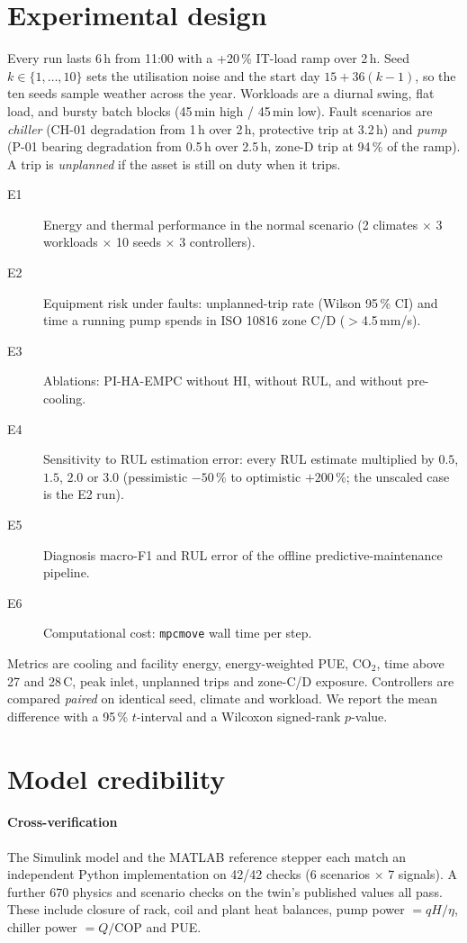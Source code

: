 \documentclass[preprint,12pt,authoryear]{elsarticle}
\begin{document}
\section{Experimental design}\label{sec:design}
Every run lasts 6\,h from 11:00 with a +20\,\% IT-load ramp over 2\,h. Seed $k\in\{1,\dots,10\}$ sets the utilisation noise and the start day $15+36(k-1)$, so the ten seeds sample weather across the year. Workloads are a diurnal swing, flat load, and bursty batch blocks (45\,min high / 45\,min low). Fault scenarios are \emph{chiller} (CH-01 degradation from 1\,h over 2\,h, protective trip at 3.2\,h) and \emph{pump} (P-01 bearing degradation from 0.5\,h over 2.5\,h, zone-D trip at 94\,\% of the ramp). A trip is \emph{unplanned} if the asset is still on duty when it trips.
\begin{description}
\item[E1] Energy and thermal performance in the normal scenario (2 climates $\times$ 3 workloads $\times$ 10 seeds $\times$ 3 controllers).
\item[E2] Equipment risk under faults: unplanned-trip rate (Wilson 95\,\% CI) and time a running pump spends in ISO 10816 zone C/D ($>$4.5\,mm/s).
\item[E3] Ablations: PI-HA-EMPC without HI, without RUL, and without pre-cooling.
\item[E4] Sensitivity to RUL estimation error: every RUL estimate multiplied by $0.5$, $1.5$, $2.0$ or $3.0$ (pessimistic $-50$\,\% to optimistic $+200$\,\%; the unscaled case is the E2 run).
\item[E5] Diagnosis macro-F1 and RUL error of the offline predictive-maintenance pipeline.
\item[E6] Computational cost: \texttt{mpcmove} wall time per step.
\end{description}
Metrics are cooling and facility energy, energy-weighted PUE, CO$_2$, time above 27 and 28\,\textdegree C, peak inlet, unplanned trips and zone-C/D exposure. Controllers are compared \emph{paired} on identical seed, climate and workload. We report the mean difference with a 95\,\% $t$-interval and a Wilcoxon signed-rank $p$-value.

\section{Model credibility}\label{sec:cred}
\paragraph{Cross-verification} The Simulink model and the MATLAB reference stepper each match an independent Python implementation on 42/42 checks (6 scenarios $\times$ 7 signals). A further 670 physics and scenario checks on the twin's published values all pass. These include closure of rack, coil and plant heat balances, pump power $=qH/\eta$, chiller power $=Q/\mathrm{COP}$ and PUE.
\end{document}
